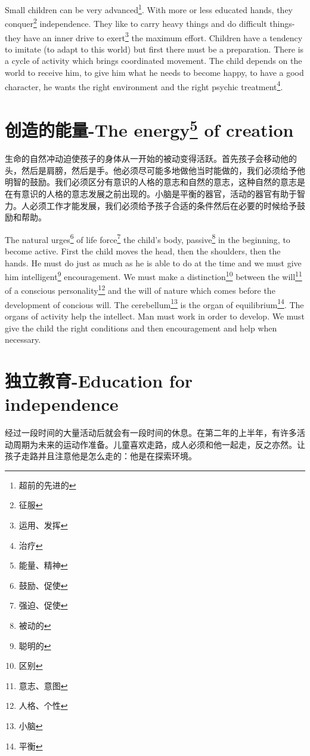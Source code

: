 \documentclass[lang=cn,10pt]{elegantbook}
\begin{document}
Small children can be very advanced\footnote{超前的先进的}. With more or less educated hands, they conquer\footnote{征服} independence. They like to carry heavy things and do difficult things-they have an inner drive to exert\footnote{运用、发挥} the maximum effort. Children have a tendency to imitate (to adapt to this world) but first there must be a preparation. There is a cycle of activity which brings coordinated movement. The child depends on the world to receive him, to give him what he needs to become happy, to have a good character, he wants the right environment and the right psychic treatment\footnote{治疗}.

\chapter{创造的能量-The energy\footnote{能量、精神} of creation}

生命的自然冲动迫使孩子的身体从一开始的被动变得活跃。首先孩子会移动他的头，然后是肩膀，然后是手。他必须尽可能多地做他当时能做的，我们必须给予他明智的鼓励。我们必须区分有意识的人格的意志和自然的意志，这种自然的意志是在有意识的人格的意志发展之前出现的。小脑是平衡的器官，活动的器官有助于智力。人必须工作才能发展，我们必须给予孩子合适的条件然后在必要的时候给予鼓励和帮助。

The natural urges\footnote{鼓励、促使} of life force\footnote{强迫、促使} the child's body, passive\footnote{被动的} in the beginning, to become active. First the child moves the head, then the shoulders, then the hands. He must do just as much as he is able to do at the time and we must give him intelligent\footnote{聪明的} encouragement. We must make a distinction\footnote{区别} between the will\footnote{意志、意图} of a conscious personality\footnote{人格、个性} and the will of nature which comes before the development of concious will. The cerebellum\footnote{小脑} is the organ of equilibrium\footnote{平衡}. The organs of activity help the intellect. Man must work in order to develop. We must give the child the right conditions and then encouragement and help when necessary.

\chapter{独立教育-Education for independence}

经过一段时间的大量活动后就会有一段时间的休息。在第二年的上半年，有许多活动周期为未来的运动作准备。儿童喜欢走路，成人必须和他一起走，反之亦然。让孩子走路并且注意他是怎么走的：他是在探索环境。
\end{document}
